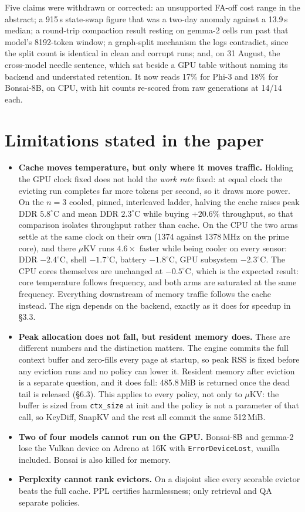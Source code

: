 \documentclass[11pt]{article}
\begin{document}
\noindent Five claims were withdrawn or corrected: an unsupported FA-off cost range in the
abstract; a 915\,s state-swap figure that was a two-day anomaly against a 13.9\,s median; a
round-trip compaction result resting on gemma-2 cells run past that model's 8192-token
window; a graph-split mechanism the logs contradict, since the split count is identical in
clean and corrupt runs; and, on 31 August, the cross-model needle sentence, which sat beside a
GPU table without naming its backend and understated retention. It now reads 17\% for Phi-3
and 18\% for Bonsai-8B, on CPU, with hit counts re-scored from raw generations at 14/14 each.

\section{Limitations stated in the paper}
\begin{itemize}\itemsep1pt\parskip0pt
\item \textbf{Cache moves temperature, but only where it moves traffic.} Holding the GPU clock
fixed does not hold the \emph{work rate} fixed: at equal clock the evicting run completes far
more tokens per second, so it draws more power. On the $n{=}3$ cooled, pinned, interleaved
ladder, halving the cache raises peak DDR $5.8^\circ$C and mean DDR $2.3^\circ$C while buying
$+20.6\%$ throughput, so that comparison isolates throughput rather than cache. On the CPU the two arms settle at the same clock on their own
(1374 against 1378\,MHz on the prime core), and there $\mu$KV runs $4.6\times$ faster while
being cooler on every sensor: DDR $-2.4^\circ$C, shell $-1.7^\circ$C, battery $-1.8^\circ$C,
GPU subsystem $-2.3^\circ$C. The CPU cores themselves are unchanged at $-0.5^\circ$C, which is
the expected result: core temperature follows frequency, and both arms are saturated at the
same frequency. Everything downstream of memory traffic follows the cache instead. The sign
depends on the backend, exactly as it does for speedup in \S3.3.
\item \textbf{Peak allocation does not fall, but resident memory does.} These are different
numbers and the distinction matters. The engine commits the full context buffer and zero-fills
every page at startup, so peak RSS is fixed before any eviction runs and no policy can lower
it. Resident memory after eviction is a separate question, and it does fall: 485.8\,MiB is
returned once the dead tail is released (\S6.3). This applies to every policy, not only to
$\mu$KV: the buffer is sized from \texttt{ctx\_size} at init and the policy is not a parameter
of that call, so KeyDiff, SnapKV and the rest all commit the same 512\,MiB.
\item \textbf{Two of four models cannot run on the GPU.} Bonsai-8B and gemma-2 lose the Vulkan
device on Adreno at 16K with \texttt{ErrorDeviceLost}, vanilla included. Bonsai is also killed
for memory.
\item \textbf{Perplexity cannot rank evictors.} On a disjoint slice every scorable evictor
beats the full cache. PPL certifies harmlessness; only retrieval and QA separate policies.
\end{itemize}
\end{document}
